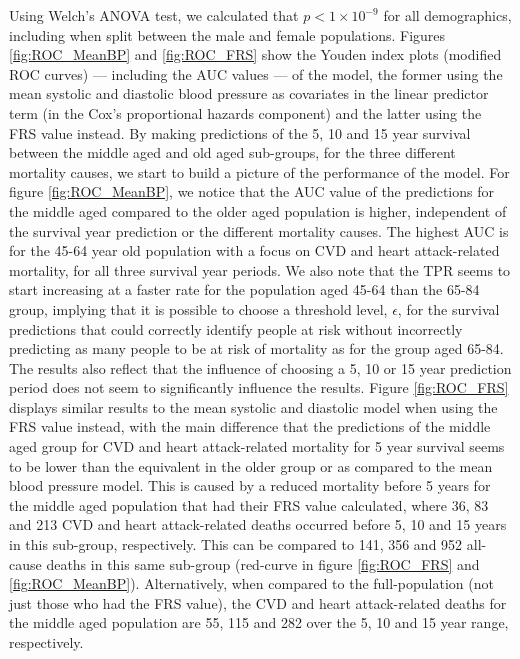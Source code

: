\documentclass[
]{article}
\begin{document}
Using Welch's ANOVA test, we calculated that \(p<1\times 10^{-9}\) for all demographics, including when split between the male and female populations. Figures \ref{fig:ROC_MeanBP} and \ref{fig:ROC_FRS} show the Youden index plots (modified ROC curves) --- including the AUC values --- of the model, the former using the mean systolic and diastolic blood pressure as covariates in the linear predictor term (in the Cox's proportional hazards component) and the latter using the FRS value instead. By making predictions of the 5, 10 and 15 year survival between the middle aged and old aged sub-groups, for the three different mortality causes, we start to build a picture of the performance of the model. For figure \ref{fig:ROC_MeanBP}, we notice that the AUC value of the predictions for the middle aged compared to the older aged population is higher, independent of the survival year prediction or the different mortality causes. The highest AUC is for the 45-64 year old population with a focus on CVD and heart attack-related mortality, for all three survival year periods. We also note that the TPR seems to start increasing at a faster rate for the population aged 45-64 than the 65-84 group, implying that it is possible to choose a threshold level, \(\epsilon\), for the survival predictions that could correctly identify people at risk without incorrectly predicting as many people to be at risk of mortality as for the group aged 65-84. The results also reflect that the influence of choosing a 5, 10 or 15 year prediction period does not seem to significantly influence the results. Figure \ref{fig:ROC_FRS} displays similar results to the mean systolic and diastolic model when using the FRS value instead, with the main difference that the predictions of the middle aged group for CVD and heart attack-related mortality for 5 year survival seems to be lower than the equivalent in the older group or as compared to the mean blood pressure model. This is caused by a reduced mortality before 5 years for the middle aged population that had their FRS value calculated, where 36, 83 and 213 CVD and heart attack-related deaths occurred before 5, 10 and 15 years in this sub-group, respectively. This can be compared to 141, 356 and 952 all-cause deaths in this same sub-group (red-curve in figure \ref{fig:ROC_FRS} and \ref{fig:ROC_MeanBP}). Alternatively, when compared to the full-population (not just those who had the FRS value), the CVD and heart attack-related deaths for the middle aged population are 55, 115 and 282 over the 5, 10 and 15 year range, respectively.
\end{document}
